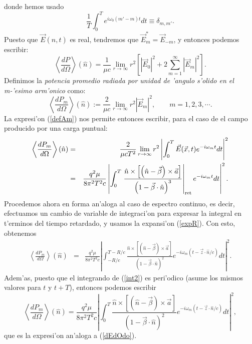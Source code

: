 donde hemos usado
\begin{equation}
\frac{1}{T}\int_0^{T}e^{i\omega_0\left(m'-m\right)t }dt\equiv\delta_{m,m' }.
\end{equation}
Puesto que $\vec{E}(\hat{n},t)$ es real, tendremos que $\vec{E}_{m}^*=\vec{E}_{-m}$, y entonces podemos escribir:
\begin{equation}
\left\langle\frac{dP}{d\Omega}\right\rangle (\hat{n}) =\frac{1}{\mu c}\lim_{r\to\infty}r^2\left[\left|\vec{E}_0\right|^2
+2\sum_{m=1}^{\infty}\left|\vec{E}_{m}\right|^2\right].
\end{equation}
Definimos la \textit{potencia promedio radiada por
unidad de 'angulo s'olido en el m-'esimo arm'onico} como:
\begin{equation}
\left\langle\frac{dP_{m}}{d\Omega}\right\rangle (\hat{n}) :=\frac{2}{\mu c}\lim_{r\to\infty}r^2\left|\vec{E}_{m}\right|^2, \qquad m=1,2,3,\cdots.
\end{equation}
La expresi'on (\ref{defAm}) nos permite entonces escribir, para el caso de el campo producido por una carga puntual:
\begin{eqnarray}
\left\langle \frac{dP_{m}}{d\Omega}\right\rangle (\hat{n})&=&
\frac{2}{\mu cT^2}\lim_{r\to\infty}r^2\left|\int_0^{T}\vec{E}(\vec{x},t)e^{-i\omega_{m}t}dt\right|^2\\
&=&\frac{q^2\mu}{8\pi^2T^2c}\left| \int_0^{T}\left.\frac{\hat{n}\times\left[  \left(\hat{n}-\vec{\beta}\right)\times\vec{a}\right] }{\left(
1-\vec{\beta}\cdot\hat{n}\right)^3}\right|_{\rm ret} e^{-i\omega_{m}t}dt\right|^2.
\end{eqnarray}
Procedemos ahora en forma an'aloga al caso de espectro continuo, es decir, efectuamos un cambio de variable de integraci'on para expresar la integral en t'erminos del tiempo retardado, y usamos la expansi'on (\ref{expR}). Con esto, obtenemos
\begin{eqnarray}
\left\langle \frac{dP_{m}}{d\Omega}\right\rangle (\hat{n})
  &=&\frac{q^2\mu}{8\pi^2T^2c}\left|
\int_{-{R}/{c}}^{T-{R}/{c}}\frac{\hat{n}\times\left[\left(\hat{n}-\vec{
\beta}\right)\times\vec{a}\right]}{\left(1-\vec{\beta}\cdot\hat{n}\right)^2} e^{-i\omega_{m}\left(t-\vec{z}\cdot\hat{n}/c\right)}dt \right|^2. \label{int2}
\end{eqnarray}
Adem'as, puesto que el integrando de (\ref{int2}) es peri'odico (asume los
mismos valores para $t$ y $t+T$), entonces podemos escribir
\begin{equation}
\boxed{\left\langle \frac{dP_{m}}{d\Omega}\right\rangle (\hat{n})
=\frac{q^2\mu}{8\pi^2T^2c}\left|
\int_0^{T}\frac{\hat{n}\times\left[\left(\hat{n}-\vec{\beta}\right)
\times\vec{a}\right]}{\left(1-\vec{\beta}\cdot\hat{n}\right)^2} e^{-i\omega_{m}\left(t-\vec{z}\cdot\hat{n}/c\right)}dt \right|^2, }\label{int3}
\end{equation}
que es la expresi'on an'aloga a (\ref{dEdOdo}).

